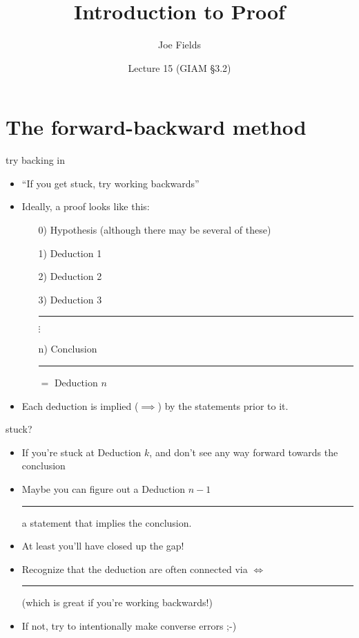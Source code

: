 \documentclass[landscape]{beamer}
\author{Joe Fields}
\title{Introduction to Proof}
\date{Lecture 15 (GIAM \S 3.2)}
\institute[SCSU]{ {\tt fieldsj1@southernct.edu} }
\begin{document}
\begin{frame}[plain]
  \titlepage
\end{frame}

\section{The forward-backward method}

\begin{frame}{try backing in}
\begin{itemize}
\item ``If you get stuck, try working backwards'' \pause
\item Ideally, a proof looks like this: \pause
\begin{enumerate}
\item[0)] Hypothesis \pause (although there may be several of these) \pause
\item[1)] Deduction 1 \pause
\item[2)] Deduction 2 \pause 
\item[3)] Deduction 3 \pause \newline
\rule{24pt}{0pt} $\displaystyle \vdots$  \pause
\item[n)] Conclusion \pause \rule{12pt}{0pt} $=$ Deduction $n$ \pause
\end{enumerate}
\item Each deduction is implied ($\implies$) by the statements prior to it.
\end{itemize}
\end{frame}

\begin{frame}{stuck?}
\begin{itemize}
\item If you're stuck at Deduction $k$, and don't see any way forward towards the conclusion\textellipsis \pause
\item Maybe you can figure out a Deduction $n-1$ \pause \newline
\rule{.2in}{0in} a statement that implies the conclusion. \pause
\item At least you'll have closed up the gap! \pause
\item Recognize that the deduction are often connected via $\iff$ \pause \newline
\rule{.2in}{0in} (which is great if you're working backwards!) \pause
\item If not, try to intentionally make converse errors ;-) 
\end{itemize}
\end{frame}
\end{document}
